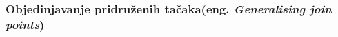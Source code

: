 %
%
%
%

\subsubsection{Objedinjavanje pridruženih tačaka(eng. \emph{Generalising join points})}
\label{sec:podpodnaslovGeneralization}

